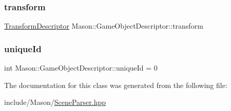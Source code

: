 \hypertarget{class_mason_1_1_game_object_descriptor_aa22b35eef207a8451a3ad6b816ecd5ac}{}\label{class_mason_1_1_game_object_descriptor_aa22b35eef207a8451a3ad6b816ecd5ac} 
\subsubsection{\texorpdfstring{transform}{transform}}
{\footnotesize\ttfamily \hyperlink{class_mason_1_1_transform_descriptor}{Transform\+Descriptor} Mason\+::\+Game\+Object\+Descriptor\+::transform}

\hypertarget{class_mason_1_1_game_object_descriptor_aafbd17cd506939c46ce70b550762e2d1}{}\label{class_mason_1_1_game_object_descriptor_aafbd17cd506939c46ce70b550762e2d1} 
\subsubsection{\texorpdfstring{unique\+Id}{uniqueId}}
{\footnotesize\ttfamily int Mason\+::\+Game\+Object\+Descriptor\+::unique\+Id = 0}



The documentation for this class was generated from the following file\+:\begin{DoxyCompactItemize}
\item 
include/\+Mason/\hyperlink{_scene_parser_8hpp}{Scene\+Parser.\+hpp}\end{DoxyCompactItemize}
